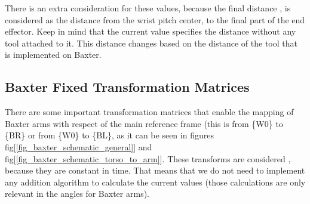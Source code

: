 \documentclass[11pt]{report} %
\begin{document}
\begin{table}[H]
\begin{center}
\caption{\label{tab:lengths_of_baxter} Lengths of Baxter robot. Adapted from \citep{cite_baxter_humanoid_robot_kinematics_ohio}.}
\end{center}
\end{table}

There is an extra consideration for these values, because the final distance , is considered as the distance from the wrist pitch center, to the final part of the end effector. Keep in mind that the current value specifies the distance without any tool attached to it. This distance changes based on the distance of the tool that is implemented on Baxter.\\


\subsection{Baxter Fixed Transformation Matrices}

There are some important transformation matrices that enable the mapping of Baxter arms with respect of the main reference frame (this is from \{W0\} to \{BR\} or from \{W0\} to \{BL\}, as it can be seen in figures fig[\ref{fig_baxter_schematic_general}] and fig[\ref{fig_baxter_schematic_torso_to_arm}]. These transforms are considered , because they are constant in time. That means that we do not need to implement any addition algorithm to calculate the current values (those calculations are only relevant in the angles for Baxter arms).\\
\end{document}
